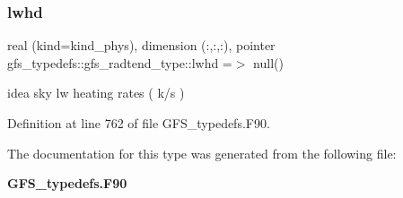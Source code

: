 \subsubsection{lwhd}
{\footnotesize\ttfamily real (kind=kind\+\_\+phys), dimension (\+:,\+:,\+:), pointer gfs\+\_\+typedefs\+::gfs\+\_\+radtend\+\_\+type\+::lwhd =$>$ null()}



idea sky lw heating rates ( k/s ) 



Definition at line 762 of file G\+F\+S\+\_\+typedefs.\+F90.



The documentation for this type was generated from the following file\+:\begin{DoxyCompactItemize}
\item 
\textbf{ G\+F\+S\+\_\+typedefs.\+F90}\end{DoxyCompactItemize}
